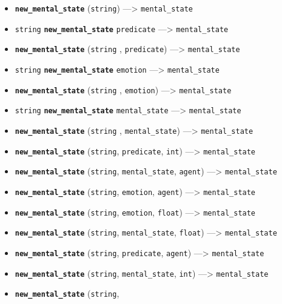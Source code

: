 \documentclass[]{book}
\providecommand{\tightlist}{%
  \setlength{\itemsep}{0pt}\setlength{\parskip}{0pt}}
\theoremstyle{definition}
\theoremstyle{definition}
\theoremstyle{definition}
\theoremstyle{remark}
\begin{document}
\begin{itemize}
\tightlist
\item
  \textbf{\texttt{new\_mental\_state}} (\texttt{string})
  ---\textgreater{} \texttt{mental\_state}
\item
  \texttt{string} \textbf{\texttt{new\_mental\_state}}
  \texttt{predicate} ---\textgreater{} \texttt{mental\_state}
\item
  \textbf{\texttt{new\_mental\_state}} (\texttt{string} ,
  \texttt{predicate}) ---\textgreater{} \texttt{mental\_state}
\item
  \texttt{string} \textbf{\texttt{new\_mental\_state}} \texttt{emotion}
  ---\textgreater{} \texttt{mental\_state}
\item
  \textbf{\texttt{new\_mental\_state}} (\texttt{string} ,
  \texttt{emotion}) ---\textgreater{} \texttt{mental\_state}
\item
  \texttt{string} \textbf{\texttt{new\_mental\_state}}
  \texttt{mental\_state} ---\textgreater{} \texttt{mental\_state}
\item
  \textbf{\texttt{new\_mental\_state}} (\texttt{string} ,
  \texttt{mental\_state}) ---\textgreater{} \texttt{mental\_state}
\item
  \textbf{\texttt{new\_mental\_state}} (\texttt{string},
  \texttt{predicate}, \texttt{int}) ---\textgreater{}
  \texttt{mental\_state}
\item
  \textbf{\texttt{new\_mental\_state}} (\texttt{string},
  \texttt{mental\_state}, \texttt{agent}) ---\textgreater{}
  \texttt{mental\_state}
\item
  \textbf{\texttt{new\_mental\_state}} (\texttt{string},
  \texttt{emotion}, \texttt{agent}) ---\textgreater{}
  \texttt{mental\_state}
\item
  \textbf{\texttt{new\_mental\_state}} (\texttt{string},
  \texttt{emotion}, \texttt{float}) ---\textgreater{}
  \texttt{mental\_state}
\item
  \textbf{\texttt{new\_mental\_state}} (\texttt{string},
  \texttt{mental\_state}, \texttt{float}) ---\textgreater{}
  \texttt{mental\_state}
\item
  \textbf{\texttt{new\_mental\_state}} (\texttt{string},
  \texttt{predicate}, \texttt{agent}) ---\textgreater{}
  \texttt{mental\_state}
\item
  \textbf{\texttt{new\_mental\_state}} (\texttt{string},
  \texttt{mental\_state}, \texttt{int}) ---\textgreater{}
  \texttt{mental\_state}
\item
  \textbf{\texttt{new\_mental\_state}} (\texttt{string},

\end{itemize}
\end{document}
